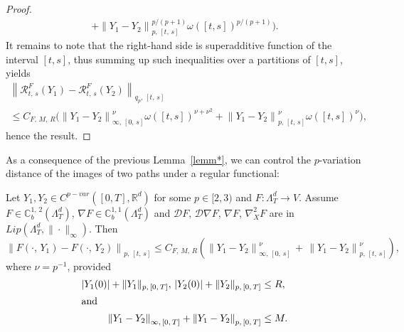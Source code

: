 \documentclass[AHL,Unicode,longabstracts,published]{cedram}
\newcommand{\bbC}{\mathbb{C}}
\newcommand{\calD}{\mathcal{D}}
\newcommand{\calR}{\mathcal{R}}
\newcommand{\Rr}{{\mathbb{R}}}
\begin{document}
\begin{proof}
\begin{multline*}
+\left\|Y_1-Y_2\right\|_{p,\,[t,\,s]}^{p/(p+1)} \omega([t,s])^{p/(p+1)} \Big).
\end{multline*}
It remains to note that the right-hand side is superadditive function of the interval $[t,s]$, thus summing up such inequalities over a partitions of $[t,s]$, yields
\begin{multline*}
\left\|\calR^{F}_{t,\,s}(Y_1)-\calR^{F}_{t,\,s}(Y_2)\right\|_{q_p,\,[t,\,s]}\\
\leq C_{F,\,M,\,R}\Big(\left\|Y_1-Y_2\right\|^{\nu}_{\infty,\,[0,\,s]} \omega([t,s])^{\nu+\nu^2}
+\left\|Y_1-Y_2\right\|_{p,\,[t,\,s]}^{\nu} \omega([t,s])^{\nu} \Big),
\end{multline*}
hence the result.
\end{proof}

As a consequence of the previous Lemma~\ref{lemm*}, we can control the $p$-variation distance of the images of two paths under a regular functional:

\begin{coro}\label{chp3Cor:controlcont}
Let $Y_1, Y_2\in C^{p-var}([0,T],\Rr^d)$ for some $p\in [2,3)$ and $F\colon \Lambda^d_T\to V$. Assume $ F\in \bbC^{1,\,2}_b(\Lambda^d_T),\, \nabla F\in \bbC^{1,1}_b(\Lambda^d_T)$ and $\calD F,\, \calD\nabla F,\, \nabla F,\, \nabla^2_{X} F$ are in $Lip(\Lambda^d_T, \|\cdot\|_{\infty})$. Then
\[
\left\|F(\cdot,\,Y_1)-F(\cdot,\,Y_2)\right\|_{p,\, [t,\,s]}\leq C_{F,\,M,\,R}\left(\left\|Y_1-Y_2\right\|_{\infty,\,[0,\,s]}^{\nu}\,+\,\left\|Y_1-Y_2\right\|_{p,\,[t,\,s]}^{\nu}\right),
\]
where $\nu=p^{-1}$, provided
\begin{align*}
\left|Y_1(0)\right|+\|Y_1\|_{p,\,[0,\,T]},\,\left|Y_2(0)\right|+\|Y_2\|_{p,\,[0,\,T]}&\leq R,
\\
\intertext{and}
\left\|Y_1-Y_2\right\|_{\infty,\,[0,\,T]}+\left\|Y_1-Y_2\right\|_{p,\,[0,\,T]}&\leq M.
\end{align*}
\end{coro}
\end{document}
